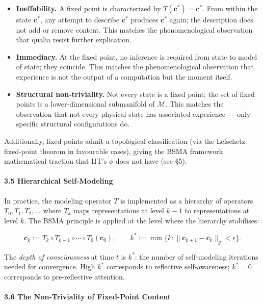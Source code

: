 \documentclass[
  11pt,
  a4paper,
]{article}
\providecommand{\tightlist}{%
  \setlength{\itemsep}{0pt}\setlength{\parskip}{0pt}}
\begin{document}
\begin{itemize}
\tightlist
\item
  \textbf{Ineffability.} A fixed point is characterized by
  \(T(\mathbf{c}^*) = \mathbf{c}^*\). From within the state
  \(\mathbf{c}^*\), any attempt to describe \(\mathbf{c}^*\) produces
  \(\mathbf{c}^*\) again; the description does not add or remove
  content. This matches the phenomenological observation that qualia
  resist further explication.
\item
  \textbf{Immediacy.} At the fixed point, no inference is required from
  state to model of state; they coincide. This matches the
  phenomenological observation that experience is not the output of a
  computation but the moment itself.
\item
  \textbf{Structural non-triviality.} Not every state is a fixed point;
  the set of fixed points is a lower-dimensional submanifold of
  \(\mathcal{M}\). This matches the observation that not every physical
  state has associated experience --- only specific structural
  configurations do.
\end{itemize}

Additionally, fixed points admit a topological classification (via the
Lefschetz fixed-point theorem in favourable cases), giving the BSMA
framework mathematical traction that IIT's \(\phi\) does not have (see
§5).

\paragraph{3.5 Hierarchical
Self-Modeling}\label{hierarchical-self-modeling}

In practice, the modeling operator \(T\) is implemented as a hierarchy
of operators \(T_0, T_1, T_2, \ldots\) where \(T_k\) maps
representations at level \(k-1\) to representations at level \(k\). The
BSMA principle is applied at the level where the hierarchy stabilises:

\[
\mathbf{c}_k := T_k \circ T_{k-1} \circ \cdots \circ T_0 (\mathbf{c}_0), \qquad k^* := \min\{k : \|\mathbf{c}_{k+1} - \mathbf{c}_k\|_g < \epsilon\}.
\]

The \emph{depth of consciousness} at time \(t\) is \(k^*\): the number
of self-modeling iterations needed for convergence. High \(k^*\)
corresponds to reflective self-awareness; \(k^* = 0\) corresponds to
pre-reflective attention.

\paragraph{3.6 The Non-Triviality of Fixed-Point
Content}\label{the-non-triviality-of-fixed-point-content}
\end{document}
